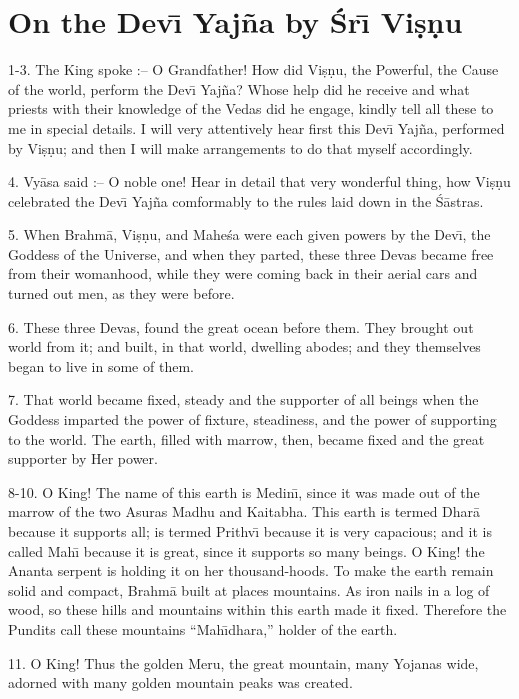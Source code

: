 \chapter{On the Dev\={\i} Yaj\~na by \'Sr\={\i} Vi\d{s}\d{n}u}

1-3. The King spoke :-- O Grandfather! How did Vi\d{s}\d{n}u, the Powerful, the Cause of the world, perform the Dev\={\i} Yaj\~na? Whose help did he receive and what priests with their knowledge of the Vedas did he engage, kindly tell all these to me in special details. I will very attentively hear first this Dev\={\i} Yaj\~na, performed by Vi\d{s}\d{n}u; and then I will make arrangements to do that myself accordingly.

4. Vy\=asa said :-- O noble one! Hear in detail that very wonderful thing, how Vi\d{s}\d{n}u celebrated the Dev\={\i} Yaj\~na comformably to the rules laid down in the \'S\=astras.

5. When Brahm\=a, Vi\d{s}\d{n}u, and Mahe\'sa were each given powers by the Dev\={\i}, the Goddess of the Universe, and when they parted, these three Devas became free from their womanhood, while they were coming back in their aerial cars and turned out men, as they were before.

6. These three Devas, found the great ocean before them. They brought out world from it; and built, in that world, dwelling abodes; and they themselves began to live in some of them.

7. That world became fixed, steady and the supporter of all beings when the Goddess imparted the power of fixture, steadiness, and the power of supporting to the world. The earth, filled with marrow, then, became fixed and the great supporter by Her power.

8-10. O King! The name of this earth is Medin\={\i}, since it was made out of the marrow of the two Asuras Madhu and Kaitabha. This earth is termed Dhar\=a because it supports all; is termed Prithv\={\i} because it is very capacious; and it is called Mah\={\i} because it is great, since it supports so many beings. O King! the Ananta serpent is holding it on her thousand-hoods. To make the earth remain solid and compact, Brahm\=a built at places mountains. As iron nails in a log of wood, so these hills and mountains within this earth made it fixed. Therefore the Pundits call these mountains ``Mah\={\i}dhara,'' holder of the earth.

11. O King! Thus the golden Meru, the great mountain, many Yojanas wide, adorned with many golden mountain peaks was created.

